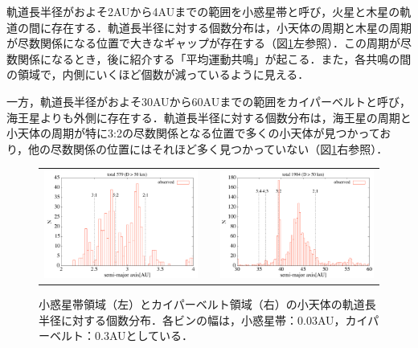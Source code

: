 \documentclass[11pt,a4paper,oneside,onecolumn]{jreport}
\begin{document}
軌道長半径がおよそ2AUから4AUまでの範囲を小惑星帯と呼び，火星と木星の軌道の間に存在する．軌道長半径に対する個数分布は，小天体の周期と木星の周期が尽数関係になる位置で大きなギャップが存在する（図\ref{fig:obs_histogram}左参照）．この周期が尽数関係になるとき，後に紹介する「平均運動共鳴」が起こる．また，各共鳴の間の領域で，内側にいくほど個数が減っているように見える．

一方，軌道長半径がおよそ30AUから60AUまでの範囲をカイパーベルトと呼び，海王星よりも外側に存在する．軌道長半径に対する個数分布は，海王星の周期と小天体の周期が特に3:2の尽数関係となる位置で多くの小天体が見つかっており，他の尽数関係の位置にはそれほど多く見つかっていない（図\ref{fig:obs_histogram}右参照）．

\begin{figure}[H]
\begin{tabular}{ccc}
\begin{minipage}[t]{0.45\hsize}
\centering
\includegraphics[width=8cm]{./image/mainbelt_histogram.pdf}
\end{minipage} &
\begin{minipage}[t]{0.1\hsize}
\end{minipage} &
\begin{minipage}[t]{0.45\hsize}
\centering
\includegraphics[width=8cm]{./image/kuiperbelt_histogram.pdf}
\end{minipage}\\
%
\end{tabular}
\caption{小惑星帯領域（左）とカイパーベルト領域（右）の小天体の軌道長半径に対する個数分布．各ビンの幅は，小惑星帯：0.03AU，カイパーベルト：0.3AUとしている．\label{fig:obs_histogram}}
\end{figure}
\end{document}
